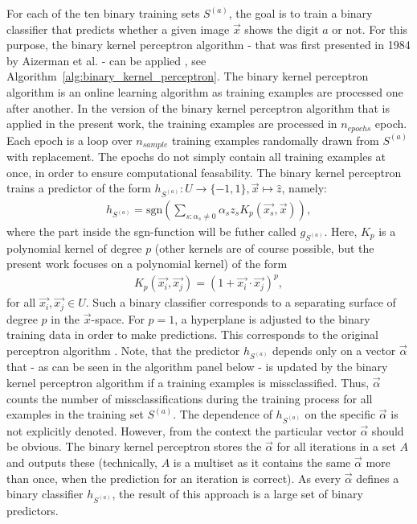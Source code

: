For each of the ten binary training sets $S^{(a)}$, the goal is to train a binary classifier that predicts whether a given image $\vec{x}$ shows the digit $a$ or not. For this purpose, the binary kernel perceptron algorithm - that was first presented in 1984 by Aizerman et al. - can be applied \cite{kernel1964}, see Algorithm~\ref{alg:binary_kernel_perceptron}. The binary kernel perceptron algorithm is an online learning algorithm as training examples are processed one after another. In the version of the binary kernel perceptron algorithm that is applied in the present work, the training examples are processed in $n_{epochs}$ epoch. Each epoch is a loop over $n_{sample}$ training examples randomally drawn from $S^{(a)}$ with replacement. The epochs do not simply contain all training examples at once, in order to ensure computational feasability. The binary kernel perceptron trains a predictor of the form $h_{S^{(a)}}: U \rightarrow \{-1, 1\}, \vec{x} \mapsto \hat{z}$, namely:
\begin{align*}
	h_{S^{(a)}} = \mathrm{sgn}\left( \sum_{s: \alpha_s \neq 0} \alpha_s z_s 	     	K_p(\vec{x_s}, \vec{x}) \right),
\end{align*}
where the part inside the sgn-function will be futher called $g_{S^{(a)}}$. Here, $K_p$ is a polynomial kernel of degree $p$ (other kernels are of course possible, but the present work focuses on a polynomial kernel) of the form
\begin{align*}
	K_p(\vec{x_i}, \vec{x_j}) = (1 + \vec{x_i} \cdot \vec{x_j})^p,
\end{align*}
for all $\vec{x_i}, \vec{x_j} \in U$. Such a binary classifier corresponds to a separating surface of degree $p$ in the $\vec{x}$-space. For $p=1$, a hyperplane is adjusted to the binary training data in order to make predictions. This corresponds to the original perceptron algorithm \cite{perceptron1957}. Note, that the predictor $h_{S^{(a)}}$ depends only on a vector $\vec{\alpha}$ that - as can be seen in the algorithm panel below - is updated by the binary kernel perceptron algorithm if a training examples is missclassified. Thus, $\vec{\alpha}$ counts the number of missclassifications during the training process for all examples in the training set $S^{(a)}$. The dependence of $h_{S^{(a)}}$ on the specific $\vec{\alpha}$ is not explicitly denoted. However, from the context the particular vector $\vec{\alpha}$ should be obvious. The binary kernel perceptron stores the $\vec{\alpha}$ for all iterations in a set $A$ and outputs these (technically, $A$ is a multiset as it contains the same $\vec{\alpha}$ more than once, when the prediction for an iteration is correct). As every $\vec{\alpha}$ defines a binary classifier $h_{S^{(a)}}$, the result of this approach is a large set of binary predictors.

